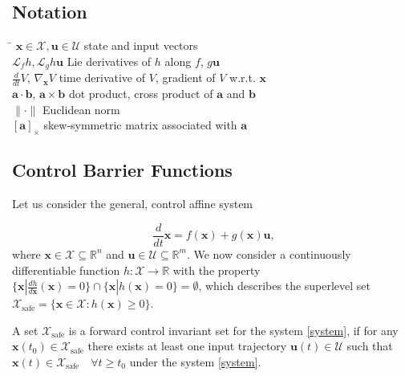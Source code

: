 \subsection{Notation}
\begin{tabbing}
 \hspace*{2.2cm} \= \kill
  $\mathbf{x} \in \mathcal{X},  \mathbf{u} \in \mathcal{U}$ \>  state and input vectors \\[0.5ex]
  $\mathcal{L}_f h, \mathcal{L}_g h \mathbf{u}$ \>  Lie derivatives of $h$ along $f$, $g \mathbf{u}$ \\[0.5ex] 
  $\frac{d}{dt} V$, $\nabla_\mathbf{x} V$ \>  time derivative of $V$, gradient of $V$ w.r.t. $\mathbf{x}$ \\[0.5ex] 
  $\mathbf{a} \cdot \mathbf{b}$, $\mathbf{a} \times \mathbf{b}$ \>  dot product, cross product of $\mathbf{a}$ and $\mathbf{b}$ \\[0.5ex]  
  $\|\cdot\|$ \>  Euclidean norm \\[0.5ex] 
  $[\mathbf{a}]_{\times}$ \>  skew-symmetric matrix associated with $\mathbf{a}$ \\[0.5ex]
\end{tabbing}

\subsection{Control Barrier Functions}
Let us consider the general, control affine system

\small
\begin{equation}\label{system}
    \frac{d}{dt} \mathbf{x} = f(\mathbf{x}) + g(\mathbf{x}) \mathbf{u},
\end{equation}
\normalsize
where $\mathbf{x} \in \mathcal{X} \subseteq \mathbb{R}^n$ and $\mathbf{u} \in \mathcal{U} \subseteq \mathbb{R}^m$. We now consider a continuously differentiable function $h: \mathcal{X} \rightarrow \mathbb{R}$ with the property $\{\mathbf{x} | \frac{dh}{d\mathbf{x}}(\mathbf{x}) = 0\} \cap \{\mathbf{x} | h(\mathbf{x}) = 0\} = \emptyset$, which describes the superlevel set $\mathcal{X}_\text{safe} = \{\mathbf{x} \in \mathcal{X}  :  h(\mathbf{x}) \geq 0 \}$.

\begin{definition}
    A set $\mathcal{X}_\text{safe}$ is a forward control invariant set for the system \eqref{system}, if for any $\mathbf{x}({t_0}) \in \mathcal{X}_\text{safe}$ there exists at least one input trajectory $\mathbf{u}(t) \in \mathcal{U}$ such that $\mathbf{x}({t}) \in \mathcal{X}_\text{safe} \quad \forall t\geq t_0$ under the system \eqref{system}.
\end{definition}


